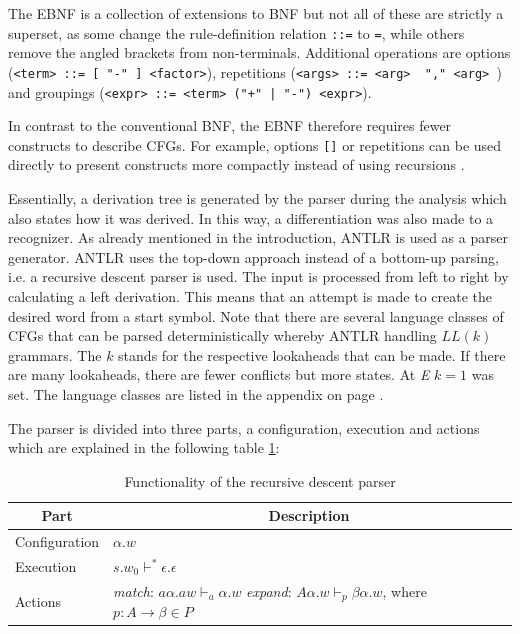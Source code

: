 \begin{defi}[EBNF]
	The EBNF is a collection of extensions to BNF but not all of these are strictly a superset, as some change the rule-definition relation \texttt{::=} to \texttt{=}, while others remove the angled brackets from non-terminals. Additional operations are options (\texttt{<term> ::= [ "-" ] <factor>}), repetitions (\texttt{<args> ::= <arg> { "," <arg> }}) and groupings (\texttt{<expr> ::= <term> ("+" | "-") <expr>}).
\end{defi}

In contrast to the conventional BNF, the EBNF therefore requires fewer constructs to describe CFGs. For example, options \texttt{[]} or repetitions \texttt{{}} can be used directly to present constructs more compactly instead of using recursions \cite{c2009}.

Essentially, a derivation tree is generated by the parser during the analysis which also states how it was derived. In this way, a differentiation was also made to a recognizer. As already mentioned in the introduction, ANTLR is used as a parser generator. ANTLR uses the top-down approach instead of a bottom-up parsing, i.e. a recursive descent parser is used. The input is processed from left to right by calculating a left derivation. This means that an attempt is made to create the desired word from a start symbol. Note that there are several language classes of CFGs that can be parsed deterministically whereby ANTLR handling $LL(k)$ grammars. The $k$ stands for the respective lookaheads that can be made. If there are many lookaheads, there are fewer conflicts but more states. At \emph{E} $k=1$ was set. The language classes are listed in the appendix on page \pageref{sec:det_cfg_classes}.

The parser is divided into three parts, a configuration, execution and actions which are explained in the following table \ref{tab:top_down_parsing}:

\begin{table}[bth]
	\centering
	\caption{Functionality of the recursive descent parser}
	\label{tab:top_down_parsing}
	\begin{tabular}{|l|l|}
		\hline
		\multicolumn{1}{|c|}{\textbf{Part}} & \multicolumn{1}{|c|}{\textbf{Description}} \\\hline
		Configuration                            & $\alpha . w$                                       \\\hline
		Execution                               & $s . w_0 \vdash^* \epsilon . \epsilon $                                       \\\hline
		Actions                                 & \makecell{\emph{match}: $a \alpha . aw \vdash_a \alpha . w$ \\ \emph{expand}: $A \alpha . w \vdash_p \beta \alpha . w$, where $p : A \rightarrow \beta \in P$}                                      \\\hline
	\end{tabular}
\end{table}

